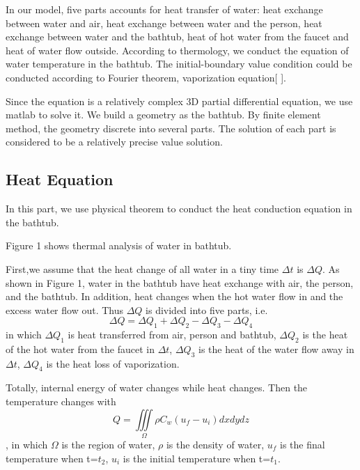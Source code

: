 \documentclass[12pt,a4paper,titlepage]{article}
\begin{document}
In our model, five parts accounts for heat transfer of water: heat exchange between water and air, heat
exchange between water and the person, heat exchange between water and the bathtub, heat of hot water from the
faucet and heat of water flow outside. According to thermology, we conduct the equation
of water temperature in the bathtub. The initial-boundary value condition could be conducted according to
Fourier theorem, vaporization equation[ ].

Since the equation is a relatively complex 3D partial differential equation, we use matlab to solve it.
We build a geometry as the bathtub. By finite element method, the geometry discrete into several parts.
The solution of each part is considered to be a relatively precise value solution.



\subsection{Heat Equation}
\label{sec:heat equation}

In this part, we use physical theorem to conduct the heat conduction equation
in the bathtub.

Figure 1 shows thermal analysis of water in bathtub.

First,we assume that the heat change of all water in a tiny time $\Delta t$ is $\Delta Q$.
As shown in Figure 1, water in the bathtub have heat exchange with air, the person, and the bathtub.
In addition, heat changes when the hot water flow in and the excess water flow out.
Thus $\Delta Q$ is divided into five parts, i.e.
\begin{equation}
 \Delta Q=\Delta Q_1+\Delta Q_2-\Delta Q_3-\Delta Q_4
\end{equation}
in which $\Delta Q_1$ is heat transferred from air, person and bathtub,
$\Delta Q_2$ is the heat of the hot water from the faucet in $\Delta t$,
$\Delta Q_3$ is the heat of the water flow away in $\Delta t$,
$\Delta Q_4$ is the heat loss of vaporization.

Totally, internal energy of water changes while heat changes.
Then the temperature changes with
\begin{equation}
 Q=\iiint\limits_{\Omega}\rho C_{w}(u_f - u_i)dx dy dz
\end{equation}
, in which $\Omega$ is the region of water, $\rho$ is the density of water, $u_f$ is the final temperature when t=$t_2$, $u_i$ is the initial temperature when t=$t_1$.
\end{document}
